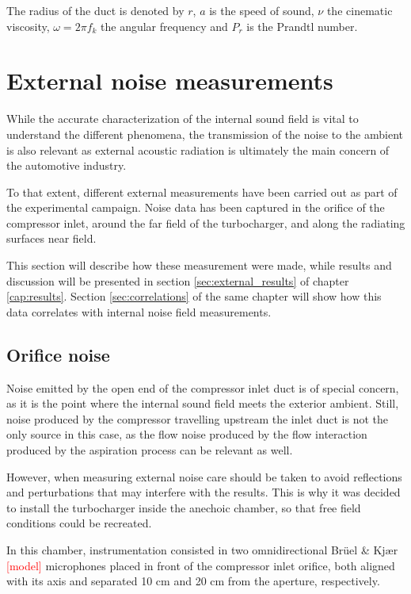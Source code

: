 The radius of the duct is denoted by $r$, $a$ is the speed of sound, $\nu$ the cinematic viscosity, $\omega=2\pi f_k$ the angular frequency and $P_r$ is the Prandtl number.

\section{External noise measurements}

While the accurate characterization of the internal sound field is vital to understand the different phenomena, the transmission of the noise to the ambient is also relevant as external acoustic radiation is ultimately the main concern of the automotive industry.

To that extent, different external measurements have been carried out as part of the experimental campaign. Noise data has been captured in the orifice of the compressor inlet, around the far field of the turbocharger, and along the radiating surfaces near field.

This section will describe how these measurement were made, while results and discussion will be presented in section \ref{sec:external_results} of chapter \ref{cap:results}. Section \ref{sec:correlations} of the same chapter will show how this data correlates with internal noise field measurements.

\subsection{Orifice noise}
\label{sub:metod_orifice_noise}

Noise emitted by the open end of the compressor inlet duct is of special concern, as it is the point where the internal sound field meets the exterior ambient. Still, noise produced by the compressor travelling upstream the inlet duct is not the only source in this case, as the flow noise produced by the flow interaction produced by the aspiration process can be relevant as well.

However, when measuring external noise care should be taken to avoid reflections and perturbations that may interfere with the results. This is why it was decided to install the turbocharger inside the anechoic chamber, so that free field conditions could be recreated.

In this chamber, instrumentation consisted in two omnidirectional Brüel \& Kjær \textcolor{red}{[model]} microphones placed in front of the compressor inlet orifice, both aligned with its axis and separated 10 cm and 20 cm from the aperture, respectively.

